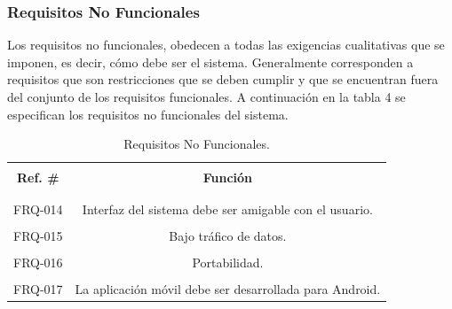 \subsubsection{Requisitos No Funcionales}

Los requisitos no funcionales, obedecen a todas las exigencias cualitativas que se imponen, es decir, cómo debe ser el sistema. Generalmente corresponden a requisitos que son restricciones que se deben cumplir y que se encuentran fuera del conjunto de los requisitos funcionales. A continuación en la tabla 4 se especifican los requisitos no funcionales del sistema.

\begin{spacing}{1.0}
\begin{table}[H]
\centering
\caption{Requisitos No Funcionales.} 
\begin{tabular}{|c|c|}
\hline 
\rowcolor{gray!30} &\\
\rowcolor{gray!30} \textbf{Ref. \#} & \textbf{Función} \\ 
\rowcolor{gray!30} &\\
\hline 
&\\[-0.2cm]
FRQ-014 & Interfaz del sistema debe ser amigable con el usuario.\\
\hline
&\\[-0.2cm]
FRQ-015 & Bajo tráfico de datos.\\
\hline
&\\[-0.2cm]
FRQ-016 & Portabilidad.\\
\hline
&\\[-0.2cm]
FRQ-017 & La aplicación móvil debe ser desarrollada para Android.\\
\hline
\end{tabular}
\label{tabla_pila}
\end{table}
\end{spacing}





